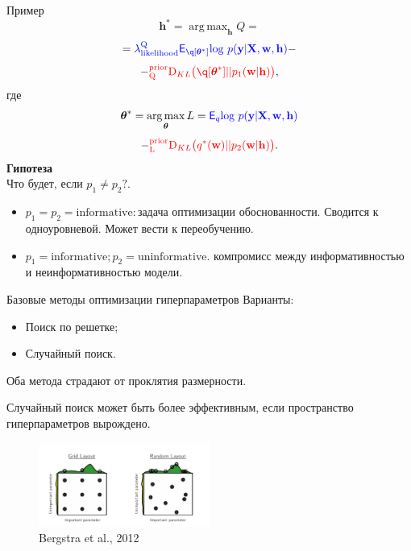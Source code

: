 \documentclass[usenames,dvipsnames,10pt,pdf,utf8,russian,aspectratio=43]{beamer}
\DeclareMathOperator*{\argmax}{arg\,max}
\begin{document}
\begin{frame}{Пример}
\[
\mathbf{h}^{*} = \argmax_{\mathbf{h}} Q = 
\]
\[
= \textcolor{blue}{\lamLL\mathsf{E}_{\q[\teta^{*}]} \text{log}~{p(\mathbf{y} | \mathbf{X}, \mathbf{w}, \mathbf{h})}}
 -\]
\vspace{-0.3cm}
\[- \textcolor{red}{^\text{prior}_\text{Q}\text{D}_{KL}\bigl(\q[\teta^{*}] || p_1(\mathbf{w} |\mathbf{h}) \bigr)},\]
где 
\[
\teta^{*} = \argmax_{\teta} L = 
\textcolor{blue}{\mathsf{E}_q \text{log}~{p(\mathbf{y} | \mathbf{X}, \mathbf{w}, \mathbf{h})}}
\]
\vspace{-0.3cm}
\[- \textcolor{red}{^\text{prior}_\text{L}\text{D}_{KL}\bigl( q^{*}(\mathbf{w}) || p_2(\mathbf{w} |\mathbf{h}) \bigr)}.
\]
\textbf{Гипотеза}\\
Что будет, если $p_1 \neq p_2?$.
\begin{itemize}
\item $p_1 = p_2 = \text{informative}: $задача оптимизации обоснованности. Сводится к одноуровневой. Может вести к переобучению.
\item $p_1 = \text{informative}; p_2 =\text{uninformative}.$ компромисс между информативностью и неинформативностью модели.
\end{itemize}

\end{frame}






\begin{frame}{Базовые методы оптимизации гиперпараметров}
Варианты:
\begin{itemize}
\item Поиск по решетке;
\item Случайный поиск.
\end{itemize}

Оба метода страдают от проклятия размерности.

Случайный поиск может быть более эффективным, если пространство гиперпараметров вырождено.
\begin{figure}
\begin{centering}
\includegraphics[width=0.5\textwidth]{random_search.png}
\end{centering}
\caption*{Bergstra et al., 2012}
\end{figure}
\end{frame}
\end{document}
